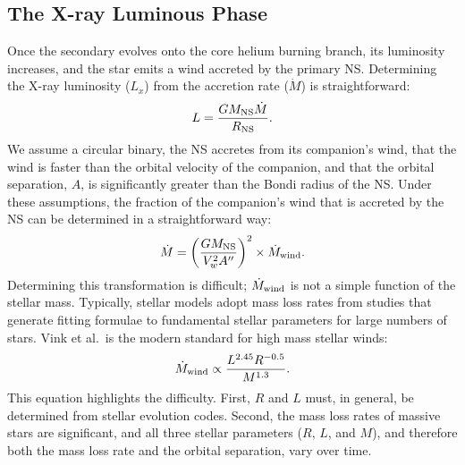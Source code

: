 \documentclass[12pt, preprint]{aastex}
\begin{document}
\subsection{The X-ray Luminous Phase} \label{sec:trans_XRB}

Once the secondary evolves onto the core helium burning branch, its luminosity increases, and the star emits a wind accreted by the primary NS. Determining the X-ray luminosity ($L_x$) from the accretion rate ($\dot{M}$) is straightforward: 
\begin{equation}
L = \frac{G M_{\rm NS} \dot{M}}{R_{\rm NS}}.
\end{equation}
We assume a circular binary, the NS accretes from its companion's wind, that the wind is faster than the orbital velocity of the companion, and that the orbital separation, $A$, is significantly greater than the Bondi radius of the NS. Under these assumptions, the fraction of the companion's wind that is accreted by the NS can be determined in a straightforward way:
\begin{equation}
\dot{M} = \left( \frac{G M_{\rm NS}}{V_w^2 A''} \right)^2 \times \dot{M}_{\rm wind}.
\end{equation}
Determining this transformation is difficult; $\dot{M}_{\rm wind}$ is not a simple function of the stellar mass. Typically, stellar models adopt mass loss rates from studies that generate fitting formulae to fundamental stellar parameters for large numbers of stars. Vink et al.\ is the modern standard for high mass stellar winds:
\begin{equation}
\dot{M}_{\rm wind} \propto \frac{L^{2.45} R^{-0.5}}{M^{1.3}}. \label{eq:vink}
\end{equation}
This equation highlights the difficulty. First, $R$ and $L$ must, in general, be determined from stellar evolution codes. Second, the mass loss rates of massive stars are significant, and all three stellar parameters ($R$, $L$, and $M$), and therefore both the mass loss rate and the orbital separation, vary over time. 
\end{document}
